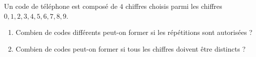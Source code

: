 \documentclass[12pt,a4paper]{article}
\begin{document}
\begin{tcolorbox}[colback=yellow!5!white,colframe=myred,title=\textbf{Exercice d'application 1}]
Un code de téléphone est composé de $4$ chiffres choisis parmi les chiffres $0, 1, 2, 3, 4, 5, 6, 7, 8, 9$.
\begin{enumerate}
    \item Combien de codes différents peut-on former si les répétitions sont autorisées ?
    \item Combien de codes peut-on former si tous les chiffres doivent être distincts ?
\end{enumerate}
\end{tcolorbox}
\end{document}
